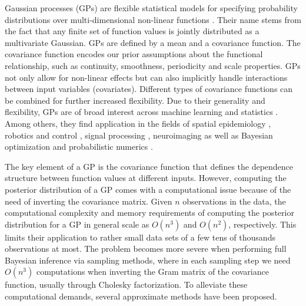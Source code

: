 \documentclass[onecolumn,a4paper,11pt]{article}
\begin{document}
Gaussian processes (GPs) are flexible statistical models for specifying probability distributions over multi-dimensional non-linear functions \citep{rasmussen2006gaussian,neal1997monte}. Their name stems from the fact that any finite set of function values is jointly distributed as a multivariate Gaussian. GPs are defined by a mean and a covariance function. The covariance function encodes our prior assumptions about the functional relationship, such as continuity, smoothness, periodicity and scale properties. GPs not only allow for non-linear effects but can also implicitly handle interactions between input variables (covariates). Different types of covariance functions can be combined for further increased flexibility. Due to their generality and flexibility, GPs are of broad interest across machine learning and statistics \citep{rasmussen2006gaussian,neal1997monte}. Among others, they find application in the fields of spatial epidemiology \citep{diggle2013statistical,carlin2014hierarchical}, robotics and control \citep{deisenroth2015gaussian}, signal processing \citep{sarkka2013spatiotemporal}, neuroimaging \citep{andersen2017} as well as Bayesian optimization and probabilistic numerics \citep{roberts2010bayesian,briol2015probabilistic,hennig2015probabilistic}.

The key element of a GP is the covariance function that defines the dependence structure between function values at different inputs. However, computing the posterior distribution of a GP comes with a computational issue because of the need of inverting the covariance matrix. Given $n$ observations in the data, the computational complexity and memory requirements of computing the posterior distribution for a GP in general scale as $O(n^3)$ and $O(n^2)$, respectively. This limits their application to rather small data sets of a few tens of thousands observations at most. The problem becomes more severe when performing full Bayesian inference via sampling methods, where in each sampling step we need $O(n^3)$ computations when inverting the Gram matrix of the covariance function, usually through Cholesky factorization. To alleviate these computational demands, several approximate methods have been proposed. 
\end{document}
